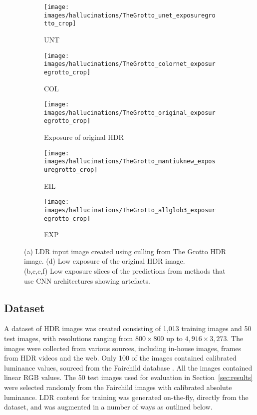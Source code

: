 \documentclass{egpubl}
\begin{document}
\begin{figure*}[htb]
\begin{subfigure}[t]{0.28\linewidth}
        \centering
        \texttt{[image: images/hallucinations/TheGrotto\_unet\_exposuregrotto\_crop]}
        \caption{UNT}
    \end{subfigure}
    \begin{subfigure}[t]{0.28\linewidth}
        \centering
        \texttt{[image: images/hallucinations/TheGrotto\_colornet\_exposuregrotto\_crop]}
        \caption{COL}
    \end{subfigure}
    \begin{subfigure}[t]{0.28\linewidth}
        \centering
        \texttt{[image: images/hallucinations/TheGrotto\_original\_exposuregrotto\_crop]}
        \caption{Exposure of original HDR}
    \end{subfigure}
    \begin{subfigure}[t]{0.28\linewidth}
        \centering
        \texttt{[image: images/hallucinations/TheGrotto\_mantiuknew\_exposuregrotto\_crop]}
        \caption{EIL}
    \end{subfigure}
    \begin{subfigure}[t]{0.28\linewidth}
        \centering
        \texttt{[image: images/hallucinations/TheGrotto\_allglob3\_exposuregrotto\_crop]}
        \caption{EXP}
    \end{subfigure}
    \caption{(a) LDR input image created using culling from The Grotto HDR
    image. (d) Low exposure of the original HDR image.\\(b,c,e,f) Low exposure
    slices of the predictions from methods that use CNN architectures showing
    artefacts.}\label{fig:hallucinations_grotto}
\end{figure*}  
\subsection{\textbf{Dataset}}\label{sec:dataset}

A dataset of HDR images was created consisting of 1,013 training images and 50
test images, with resolutions ranging from $800\times800$ up to
$4,916\times3,273$. The images were collected from various sources, including
in-house images, frames from HDR videos and the web. Only 100 of the images
contained calibrated luminance values, sourced from the Fairchild database
\cite{fairchild2007hdr}. All the images contained linear RGB values. The 50
test images used for evaluation in Section~\ref{sec:results} were selected
randomly from the Fairchild images with calibrated absolute luminance. LDR
content for training was generated on-the-fly, directly from the dataset, and
was augmented in a number of ways as outlined below.
\end{document}
